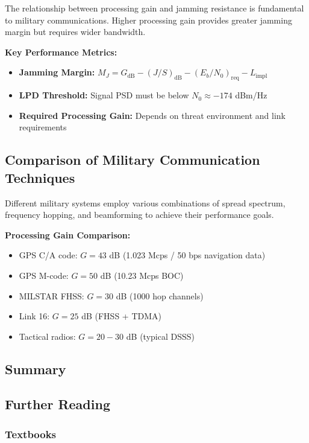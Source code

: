 The relationship between processing gain and jamming resistance is fundamental to military communications. Higher processing gain provides greater jamming margin but requires wider bandwidth.

\textbf{Key Performance Metrics:}

\begin{itemize}
\item \textbf{Jamming Margin:} $M_J = G_{\text{dB}} - (J/S)_{\text{dB}} - (E_b/N_0)_{\text{req}} - L_{\text{impl}}$
\item \textbf{LPD Threshold:} Signal PSD must be below $N_0 \approx -174$ dBm/Hz
\item \textbf{Required Processing Gain:} Depends on threat environment and link requirements
\end{itemize}

\subsection{Comparison of Military Communication Techniques}

Different military systems employ various combinations of spread spectrum, frequency hopping, and beamforming to achieve their performance goals.

\textbf{Processing Gain Comparison:}
\begin{itemize}
\item GPS C/A code: $G = 43$ dB (1.023 Mcps / 50 bps navigation data)
\item GPS M-code: $G = 50$ dB (10.23 Mcps BOC)
\item MILSTAR FHSS: $G = 30$ dB (1000 hop channels)
\item Link 16: $G = 25$ dB (FHSS + TDMA)
\item Tactical radios: $G = 20-30$ dB (typical DSSS)
\end{itemize}

\subsection{Summary}

\subsection{\texorpdfstring{Further
Reading}{ Further Reading}}\label{further-reading}

\subsubsection{Textbooks}\label{textbooks}

